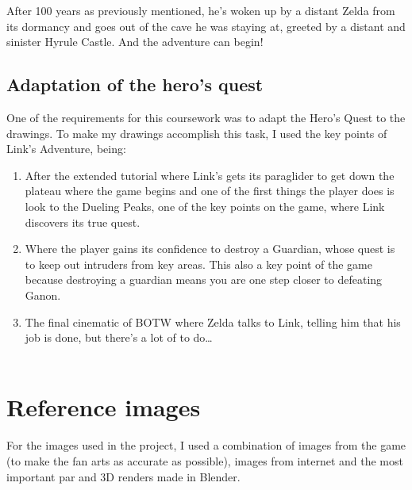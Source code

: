 \documentclass{cup-pan}
\begin{document}
    After 100 years as previously mentioned, he's woken up by a distant Zelda from its dormancy and goes out of the cave he was staying at, greeted by a distant and sinister Hyrule Castle. And the adventure can begin!\\
    
    \subsection{Adaptation of the hero's quest}
    One of the requirements for this coursework was to adapt the Hero's Quest to the drawings.
    To make my drawings accomplish this task, I used the key points of Link's Adventure, being:\\
        \begin{enumerate}
            \item After the extended tutorial where Link's gets its paraglider to get down the plateau where the game begins and one of the first things the player does is look to the Dueling Peaks, one of the key points on the game, where Link discovers its true quest.\\
            \item Where the player gains its confidence to destroy a Guardian, whose quest is to keep out intruders from key areas. This also a key point of the game because destroying a guardian means you are one step closer to defeating Ganon. \\
            \item The final cinematic of BOTW where Zelda talks to Link, telling him that his job is done, but there's a lot of to do\dots\\  \\
        \end{enumerate}

\newpage
\section{Reference images}

    For the images used in the project, I used a combination of images from the game (to make the fan arts as accurate as possible), images from internet and the most important par and 3D renders made in Blender.\\
\end{document}
